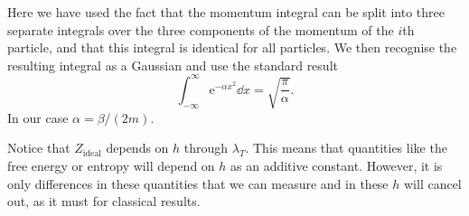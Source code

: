 \documentclass[fleqn]{NotesClass}
\newcommand*{\e}{\mathrm{e}}
\begin{document}
    Here we have used the fact that the momentum integral can be split into three separate integrals over the three components of the momentum of the \(i\)th particle, and that this integral is identical for all particles.
    We then recognise the resulting integral as a Gaussian and use the standard result
    \begin{equation}
        \int_{-\infty}^{\infty} \e^{-\alpha x^2} \dd{x} = \sqrt{\frac{\pi}{\alpha}}.
    \end{equation}
    In our case \(\alpha = \beta/(2m)\).
    
    Notice that \(Z_{\mathrm{ideal}}\) depends on \(h\) through \(\lambda_T\).
    This means that quantities like the free energy or entropy will depend on \(h\) as an additive constant.
    However, it is only differences in these quantities that we can measure and in these \(h\) will cancel out, as it must for classical results.
    
\end{document}
